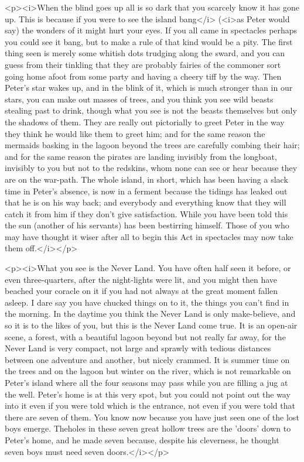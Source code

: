 

\begin{stagedir}

<p><i>When the blind goes up all is so dark that you scarcely know it has gone up.
This is because if you were to see the island bang</i> (<i>as Peter would say) the wonders of it might hurt your eyes.
If you all came in spectacles perhaps you could see it bang, but to make a rule of that kind would be a pity.
The first thing seen is merely some whitish dots trudging along the sward, and you can guess from their tinkling that they are probably fairies of the commoner sort going home afoot from some party and having a cheery tiff by the way.
Then Peter's star wakes up, and in the blink of it, which is much stronger than in our stars, you can make out masses of trees, and you think you see wild beasts stealing past to drink, though what you see is not the beasts themselves but only the shadows of them.
They are really out pictorially to greet Peter in the way they think he would like them to greet him; and for the same reason the mermaids basking in the lagoon beyond the trees are carefully combing their hair; and for the same reason the pirates are landing invisibly from the longboat, invisibly to you but not to the redskins, whom none can see or hear because they are on the war-path.
The whole island, in short, which has been having a slack time in Peter's absence, is now in a ferment because the tidings has leaked out that he is on his way back; and everybody and everything know that they will catch it from him if they don't give satisfaction.
While you have been told this the sun (another of his servants) has been bestirring himself.
Those of you who may have thought it wiser after all to begin this Act in spectacles may now take them off.</i></p>

<p><i>What you see is the Never Land.
You have often half seen it before, or even three-quarters, after the night-lights were lit, and you might then have beached your coracle on it if you had not always at the great moment fallen asleep.
I dare say you have chucked things on to it, the things you can't find in the morning.
In the daytime you think the Never Land is only make-believe, and so it is to the likes of you, but this is the Never Land come true.
It is an open-air scene, a forest, with a beautiful lagoon beyond but not really far away, for the Never Land is very compact, not large and sprawly with tedious distances between one adventure and another, but nicely crammed.
It is summer time on the trees and on the lagoon but winter on the river, which is not remarkable on Peter's island where all the four seasons may pass while you are filling a jug at the well.
Peter's home is at this very spot, but you could not point out the way into it even if you were told which is the entrance, not even if you were told that there are seven of them.
You know now because you have just seen one of the lost boys emerge.
Theholes in these seven great hollow trees are the 'doors' down to Peter's home, and he made seven because, despite his cleverness, he thought seven boys must need seven doors.</i></p>


\end{stagedir}
